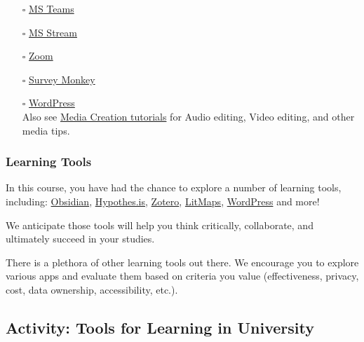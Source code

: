 \documentclass[
]{book}
\providecommand{\tightlist}{%
  \setlength{\itemsep}{0pt}\setlength{\parskip}{0pt}}
\theoremstyle{definition}
\theoremstyle{definition}
\theoremstyle{definition}
\theoremstyle{definition}
\theoremstyle{remark}
\begin{document}
\begin{itemize}
\tightlist
\item[$\square$]
  \href{https://trinitywestern.teamdynamix.com/TDClient/1904/Portal/KB/?CategoryID=17821\&SIDs=11353}{MS Teams}\\
\item[$\square$]
  \href{https://trinitywestern.teamdynamix.com/TDClient/1904/Portal/KB/?CategoryID=23454}{MS Stream}\\
\item[$\square$]
  \href{https://trinitywestern.teamdynamix.com/TDClient/1904/Portal/KB/?CategoryID=17478}{Zoom}\\
\item[$\square$]
  \href{https://trinitywestern.teamdynamix.com/TDClient/1904/Portal/KB/ArticleDet?ID=47076}{Survey Monkey}\\
\item[$\square$]
  \href{https://trinitywestern.teamdynamix.com/TDClient/1904/Portal/KB/?CategoryID=4746}{WordPress}\\
  Also see \href{https://trinitywestern.teamdynamix.com/TDClient/1904/Portal/KB/?CategoryID=6940}{Media Creation tutorials} for Audio editing, Video editing, and other media tips.
\end{itemize}

\hypertarget{learning-tools}{%
\subsubsection*{Learning Tools}\label{learning-tools}}

In this course, you have had the chance to explore a number of learning tools, including: \href{https://obsidian.md}{Obsidian}, \href{https://trinitywestern.teamdynamix.com/TDClient/1904/Portal/KB/ArticleDet?ID=146716}{Hypothes.is}, \href{https://www.zotero.org/}{Zotero}, \href{https://www.litmaps.com/}{LitMaps}, \href{https://create.twu.ca/}{WordPress} and more!

We anticipate those tools will help you think critically, collaborate, and ultimately succeed in your studies.

There is a plethora of other learning tools out there. We encourage you to explore various apps and evaluate them based on criteria you value (effectiveness, privacy, cost, data ownership, accessibility, etc.).

\hypertarget{activity-tools-for-learning-in-university}{%
\subsection*{Activity: Tools for Learning in University}\label{activity-tools-for-learning-in-university}}
\end{document}
